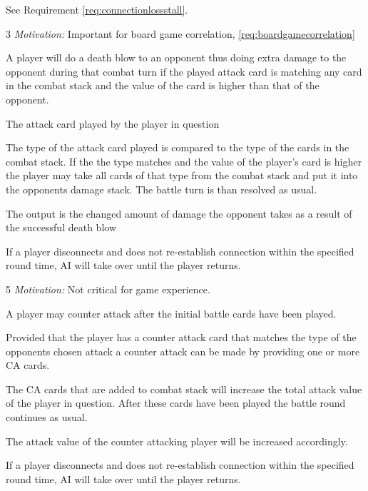See Requirement \ref{req:connectionlossstall}.

3 \emph{Motivation:} Important for board game correlation, \ref{req:boardgamecorrelation}

\stoprequirement


 A player will do a death blow to an opponent thus doing extra damage to the opponent during that combat turn if the played attack card is matching any card in the combat stack and the value of the card is higher than that of the opponent.

 The attack card played by the player in question

 The type of the attack card played is compared to the type of the cards in the combat stack. If the the type matches and the value of the player's card is higher the player may take all cards of that type from the combat stack and put it into the opponents damage stack. The battle turn is than resolved as usual.

 The output is the changed amount of damage the opponent takes as a result of the successful death blow

 If a player disconnects and does not re-establish connection within the specified round time, AI will take over until the player returns.

5 \emph{Motivation:} Not critical for game experience.

\stoprequirement


 A player may counter attack after the initial battle cards have been played.

 Provided that the player has a counter attack card that matches the type of the opponents chosen attack a counter attack can be made by providing one or more CA cards. 

 The CA cards that are added to combat stack will increase the total attack value of the player in question. After these cards have been played the battle round continues as usual.

 The attack value of the counter attacking player will be increased accordingly.

 If a player disconnects and does not re-establish connection within the specified round time, AI will take over until the player returns.


